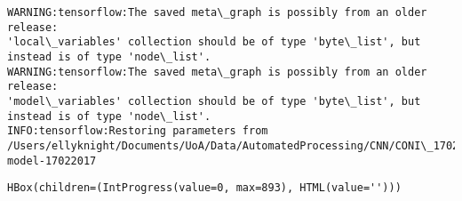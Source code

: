 \documentclass[11pt]{article}
\begin{document}
    \begin{Verbatim}[commandchars=\\\{\}]
WARNING:tensorflow:The saved meta\_graph is possibly from an older release:
'local\_variables' collection should be of type 'byte\_list', but instead is of type 'node\_list'.
WARNING:tensorflow:The saved meta\_graph is possibly from an older release:
'model\_variables' collection should be of type 'byte\_list', but instead is of type 'node\_list'.
INFO:tensorflow:Restoring parameters from /Users/ellyknight/Documents/UoA/Data/AutomatedProcessing/CNN/CONI\_17022017/coni-model-17022017

    \end{Verbatim}

    
    \begin{verbatim}
HBox(children=(IntProgress(value=0, max=893), HTML(value='')))
    \end{verbatim}

    
    \begin{Verbatim}[commandchars=\\\{\}]


    \end{Verbatim}


    
    
    
    
\end{document}
